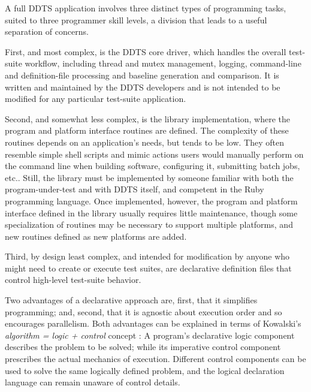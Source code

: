 \documentclass[conference]{IEEEtran}
\begin{document}
A full DDTS application involves three distinct types of programming tasks, suited to three programmer skill levels, a division that leads to a useful separation of concerns.

First, and most complex, is the DDTS core driver, which handles the overall test-suite workflow, including thread and mutex management, logging, command-line and definition-file processing and baseline generation and comparison. It is written and maintained by the DDTS developers and is not intended to be modified for any particular test-suite application.

Second, and somewhat less complex, is the library implementation, where the program and platform interface routines are defined. The complexity of these routines depends on an application's needs, but tends to be low. They often resemble simple shell scripts and mimic actions users would manually perform on the command line when building software, configuring it, submitting batch jobs, etc.. Still, the library must be implemented by someone familiar with both the program-under-test and with DDTS itself, and competent in the Ruby programming language. Once implemented, however, the program and platform interface defined in the library usually requires little maintenance, though some specialization of routines may be necessary to support multiple platforms, and new routines defined as new platforms are added.

Third, by design least complex, and intended for modification by anyone who might need to create or execute test suites, are declarative definition files that control high-level test-suite behavior.

Two advantages of a declarative approach are, first, that it simplifies programming; and, second, that it is agnostic about execution order and so encourages parallelism. Both advantages can be explained in terms of Kowalski's \emph{algorithm = logic + control} concept \cite{logic-control}: A program's declarative logic component describes the problem to be solved; while its imperative control component prescribes the actual mechanics of execution. Different control components can be used to solve the same logically defined problem, and the logical declaration language can remain unaware of control details.
\end{document}
